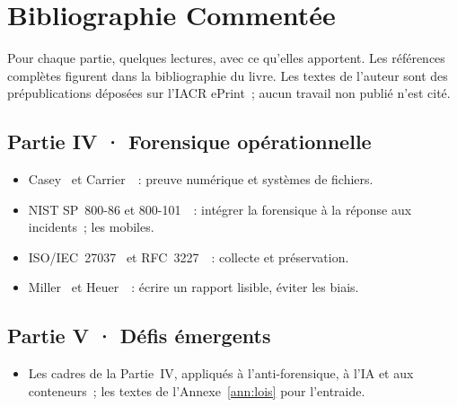 
\chapter{Bibliographie Commentée}
\label{ann:biblio}

Pour chaque partie, quelques lectures, avec ce qu'elles apportent. Les références
complètes figurent dans la bibliographie du livre. Les textes de l'auteur sont des
prépublications déposées sur l'IACR ePrint~; aucun travail non publié n'est cité.

\section*{Partie IV · Forensique opérationnelle}
\begin{itemize}
    \item Casey~\cite{casey2004} et Carrier~\cite{carrier2005}~: preuve numérique et systèmes de fichiers.
    \item NIST SP~800-86 et 800-101~\cite{nist80086,nist800101r1}~: intégrer la forensique à la réponse aux incidents~; les mobiles.
    \item ISO/IEC~27037~\cite{iso27037} et RFC~3227~\cite{rfc3227}~: collecte et préservation.
    \item Miller~\cite{miller1956} et Heuer~\cite{heuer1999}~: écrire un rapport lisible, éviter les biais.
\end{itemize}

\section*{Partie V · Défis émergents}
\begin{itemize}
    \item Les cadres de la Partie~IV, appliqués à l'anti-forensique, à l'IA et aux conteneurs~; les textes de l'Annexe~\ref{ann:lois} pour l'entraide.
\end{itemize}

